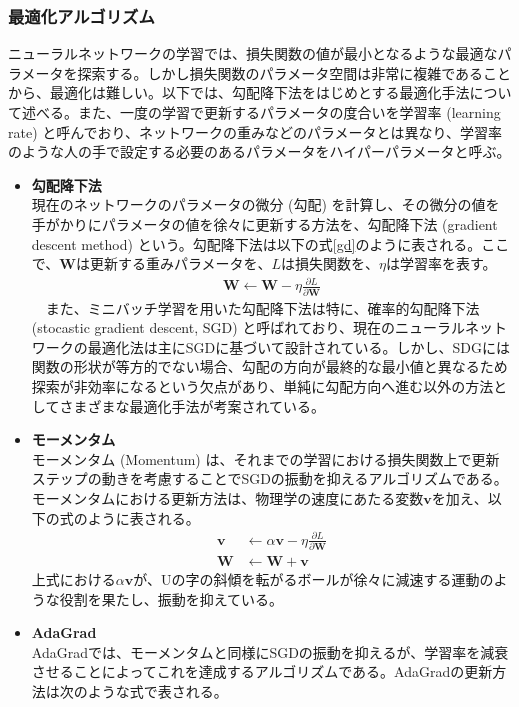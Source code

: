 \subsubsection{最適化アルゴリズム}
ニューラルネットワークの学習では、損失関数の値が最小となるような最適なパラメータを探索する。しかし損失関数のパラメータ空間は非常に複雑であることから、最適化は難しい。以下では、勾配降下法をはじめとする最適化手法について述べる。また、一度の学習で更新するパラメータの度合いを学習率 (learning rate) と呼んでおり、ネットワークの重みなどのパラメータとは異なり、学習率のような人の手で設定する必要のあるパラメータをハイパーパラメータと呼ぶ。
\begin{itemize}
\item \textbf{勾配降下法}\\
現在のネットワークのパラメータの微分 (勾配) を計算し、その微分の値を手がかりにパラメータの値を徐々に更新する方法を、勾配降下法 (gradient descent method) という。勾配降下法は以下の式\ref{gd}のように表される。ここで、$\bm{W}$は更新する重みパラメータを、$L$は損失関数を、$\eta$は学習率を表す。
\begin{align}
 \label{gd}
 \bm{W} \leftarrow \bm{W} - \eta \frac{\partial L}{\partial \bm{W}}
\end{align}
　また、ミニバッチ学習を用いた勾配降下法は特に、確率的勾配降下法 (stocastic gradient descent, SGD) と呼ばれており、現在のニューラルネットワークの最適化法は主にSGDに基づいて設計されている。しかし、SDGには関数の形状が等方的でない場合、勾配の方向が最終的な最小値と異なるため探索が非効率になるという欠点があり、単純に勾配方向へ進む以外の方法としてさまざまな最適化手法が考案されている。
\item \textbf{モーメンタム}\\
モーメンタム (Momentum) は、それまでの学習における損失関数上で更新ステップの動きを考慮することでSGDの振動を抑えるアルゴリズムである。モーメンタムにおける更新方法は、物理学の速度にあたる変数$\bm{v}$を加え、以下の式のように表される。
\begin{align}
\bm{v} &\leftarrow \alpha \bm{v} - \eta \frac{\partial L}{\partial \bm{W}}\\
\bm{W} &\leftarrow \bm{W} + \bm{v}
\end{align}
上式における$\alpha \bm{v}$が、Uの字の斜傾を転がるボールが徐々に減速する運動のような役割を果たし、振動を抑えている。
\item \textbf{AdaGrad}\\
AdaGradでは、モーメンタムと同様にSGDの振動を抑えるが、学習率を減衰させることによってこれを達成するアルゴリズムである。AdaGradの更新方法は次のような式で表される。

\end{itemize}
